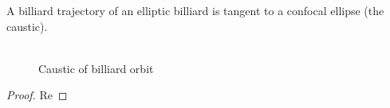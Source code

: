\begin{proposition}
   A billiard trajectory of an elliptic billiard is tangent to a confocal ellipse (the caustic).
\end{proposition}
\begin{figure}
    \centering
    \includegraphics[width=0.6]{ii_chap_09/pics/pics_09_045_caustica_reflexao.pdf}
    \caption{Caustic of billiard orbit}
    \label{fig:09-caustic}
\end{figure}
\begin{proof}
Re
\end{proof}